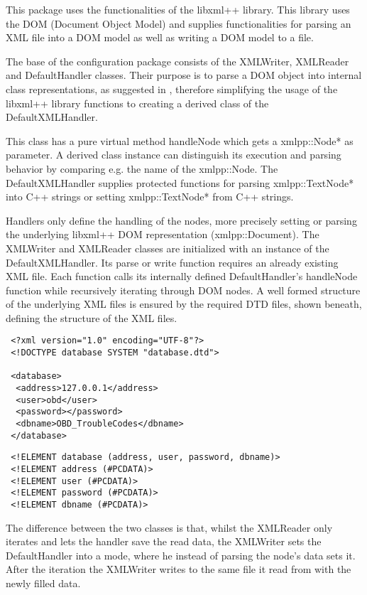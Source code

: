This package uses the functionalities of the libxml++ \cite{XMLLIB} library. This library uses the DOM (Document Object Model) and supplies functionalities 
for parsing an XML file into a DOM model as well as writing a DOM model to a file. 

The base of the configuration package consists of the XMLWriter, XMLReader and DefaultHandler classes. Their purpose is to parse a DOM object 
into internal class representations, as suggested in , therefore simplifying the usage of the libxml++ library functions to creating 
a derived class of the DefaultXMLHandler. 

This class has a pure virtual method handleNode which gets a xmlpp::Node* as parameter. A derived class instance can distinguish its execution 
and parsing behavior by comparing e.g. the name of the xmlpp::Node. The DefaultXMLHandler supplies protected functions for parsing 
xmlpp::TextNode* into C++ strings or setting xmlpp::TextNode* from C++ strings. 

Handlers only define the handling of the nodes, more precisely setting  or parsing the underlying libxml++ DOM representation (xmlpp::Document). 
The XMLWriter and XMLReader classes are initialized with an instance of the DefaultXMLHandler. Its parse or write function requires an already 
existing XML file. Each function calls its internally defined DefaultHandler’s handleNode function while recursively iterating through DOM nodes. 
A well formed structure of the underlying XML files is ensured by the required DTD files, shown beneath, defining the structure of the XML files.

\begin{verbatim}
 <?xml version="1.0" encoding="UTF-8"?>
 <!DOCTYPE database SYSTEM "database.dtd">

 <database>
  <address>127.0.0.1</address>
  <user>obd</user>
  <password></password>
  <dbname>OBD_TroubleCodes</dbname>
 </database>
\end{verbatim}

\begin{verbatim}
 <!ELEMENT database (address, user, password, dbname)>
 <!ELEMENT address (#PCDATA)>
 <!ELEMENT user (#PCDATA)>
 <!ELEMENT password (#PCDATA)>
 <!ELEMENT dbname (#PCDATA)>
\end{verbatim}

The difference between the two classes is that, whilst the XMLReader only iterates and lets the handler save the read data, the XMLWriter sets 
the DefaultHandler into a mode, where he instead of parsing the node’s data sets it. After the iteration the XMLWriter writes to the same file 
it read from with the newly filled data.

